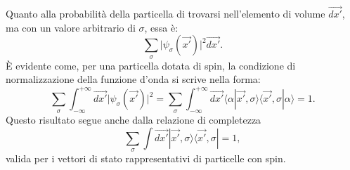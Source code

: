 \documentclass[a4paper,12pt,oneside]{book}
\begin{document}
Quanto alla probabilità della particella di trovarsi nell'elemento di volume $\vec{dx'}$, ma con un valore arbitrario di $\sigma$, essa è:
\begin{equation}
\sum_{\sigma} \vert\psi_{\sigma}(\vec{x'})\vert^{2}\vec{dx'}  .
\end{equation}
È evidente come, per una particella dotata di spin, la condizione di normalizzazione della funzione d'onda si scrive nella forma:
\begin{equation}
\sum_{\sigma} \int_{-\infty}^{+\infty}\vec{dx'}\vert\psi_{\sigma}(\vec{x'})\vert^{2}=\sum_{\sigma} \int_{-\infty}^{+\infty}\vec{dx'}\langle\alpha|\vec{x'}, \sigma\rangle\langle\vec{x'}, \sigma|\alpha\rangle=1 .
\end{equation}
Questo risultato segue anche dalla relazione di completezza
\begin{equation}
\sum_{\sigma} \int \vec{dx'}|\vec{x'}, \sigma\rangle\langle\vec{x'}, \sigma|=1 ,
\end{equation}
valida per i vettori di stato rappresentativi di particelle con spin.
\end{document}
